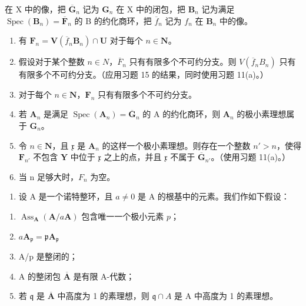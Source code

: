 在 X 中的像，把 \(\overline{\mathbf{G}}_n\) 记为 \(\mathbf{G}_n\) 在 X 中的闭包，把 \(\mathbf{B}_n\) 记为满足 \(\operatorname{Spec}(\mathbf{B}_n) = \overline{\mathbf{F}}_n\) 的 B 的约化商环，把 \(\overline{f}_n\) 记为 \(f_n\) 在 \(\mathbf{B}_n\) 中的像。

\begin{enumerate}
\def\labelenumi{\alph{enumi})}
\item
  有 \(\mathbf{F}_n = \mathbf{V}(\overline{f}_n\mathbf{B}_n)\cap \mathbf{U}\) 对于每个 \(n\in \mathbf{N}\)。
\item
  假设对于某个整数 \(n \in N\)，\(\overline{F}_{n}\) 只有有限多个不可约分支。则 \(V(\overline{f}_{n}B_{n})\) 只有有限多个不可约分支。（应用习题 15 的结果，同时使用习题 11(a)。）
\item
  对于每个 \(n\in\mathbf{N}\)，\(\mathbf{F}_{n}\) 只有有限多个不可约分支。
\item
  若 \(\mathbf{A}_n\) 是满足 \(\operatorname{Spec}(\mathbf{A}_n) = \overline{\mathbf{G}}_n\) 的 A 的约化商环，则 \(\mathbf{A}_n\) 的极小素理想属于 \(\mathbf{G}_n\)。
\item
  令 \(n \in \mathbf{N}\)，且 \(\mathfrak{x}\) 是 \(\mathbf{A}_n\) 的这样一个极小素理想。则存在一个整数 \(n' > n\)，使得 \(\mathbf{F}_{n'}\) 不包含 \(\mathbf{Y}\) 中位于 \(\mathfrak{x}\) 之上的点，并且 \(\mathfrak{x}\) 不属于 \(\overline{\mathbf{G}}_{n'}\)。（使用习题 11(a)。）
\item
  当 n 足够大时，\(F_{n}\) 为空。
\end{enumerate}

\begin{enumerate}
\def\labelenumi{\arabic{enumi})}
\setcounter{enumi}{16}
\tightlist
\item
  设 A 是一个诺特整环，且 \(a \neq 0\) 是 A 的根基中的元素。我们作如下假设：
\end{enumerate}

\begin{enumerate}
\def\labelenumi{(\roman{enumi})}
\item
  \(\operatorname{Ass}_{\mathbf{A}}(\mathbf{A} / a\mathbf{A})\) 包含唯一一个极小元素 \(p\)；
\item
  \(a\mathbf{A}_{\mathfrak{p}} = \mathfrak{p}\mathbf{A}_{\mathfrak{p}}\)
\item
  A/p 是整闭的；
\item
  A 的整闭包 \(\overline{\mathbf{A}}\) 是有限 A-代数；
\item
  若 \(\mathfrak{q}\) 是 \(\overline{\mathbf{A}}\) 中高度为 1 的素理想，则 \(\mathfrak{q} \cap A\) 是 A 中高度为 1 的素理想。
\end{enumerate}

